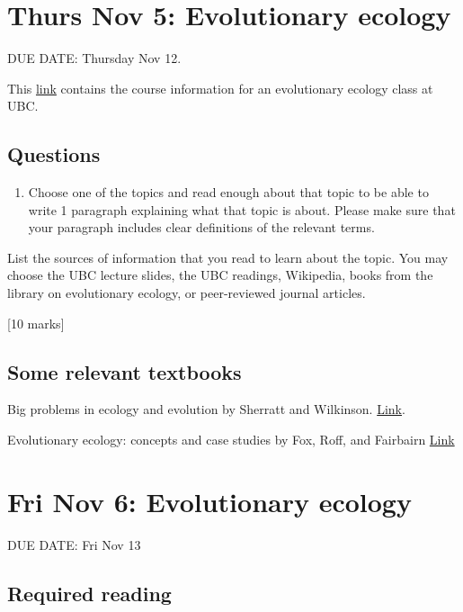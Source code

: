 \documentclass[]{book}
\providecommand{\tightlist}{%
  \setlength{\itemsep}{0pt}\setlength{\parskip}{0pt}}
\begin{document}
\chapter{Thurs Nov 5: Evolutionary
ecology}\label{thurs-nov-5-evolutionary-ecology}

DUE DATE: Thursday Nov 12.

This \href{https://www.zoology.ubc.ca/~bio418/}{link} contains the
course information for an evolutionary ecology class at UBC.

\section{Questions}\label{questions}

\begin{enumerate}
\def\labelenumi{\arabic{enumi}.}
\tightlist
\item
  Choose one of the topics and read enough about that topic to be able
  to write 1 paragraph explaining what that topic is about. Please make
  sure that your paragraph includes clear definitions of the relevant
  terms.
\end{enumerate}

List the sources of information that you read to learn about the topic.
You may choose the UBC lecture slides, the UBC readings, Wikipedia,
books from the library on evolutionary ecology, or peer-reviewed journal
articles.

{[}10 marks{]}

\section{Some relevant textbooks}\label{some-relevant-textbooks}

Big problems in ecology and evolution by Sherratt and Wilkinson.
\href{https://ebookcentral.proquest.com/lib/mun/reader.action?docID=430616\&ppg=136}{Link}.

Evolutionary ecology: concepts and case studies by Fox, Roff, and
Fairbairn
\href{https://ebookcentral-proquest-com.qe2a-proxy.mun.ca/lib/mun/detail.action?docID=430289}{Link}

\chapter{Fri Nov 6: Evolutionary
ecology}\label{fri-nov-6-evolutionary-ecology}

DUE DATE: Fri Nov 13

\section{Required reading}\label{required-reading}
\end{document}
